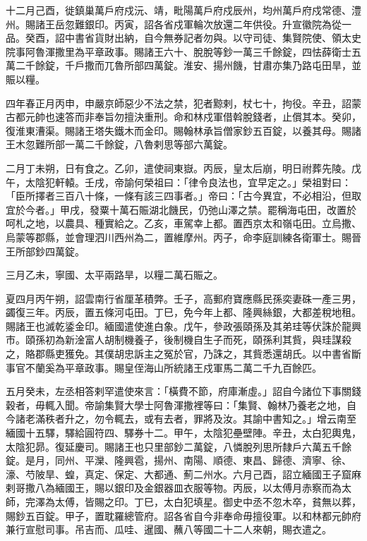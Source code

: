 \begin{pinyinscope}
 十二月己酉，徙鎮巢萬戶府戍沅、靖，毗陽萬戶府戍辰州，均州萬戶府戍常德、澧州。賜諸王岳忽難銀印。丙寅，詔各省戍軍輪次放還二年供役。升宣徽院為從一品。癸酉，詔中書省貨財出納，自今無券記者勿與。以守司徒、集賢院使、領太史院事阿魯渾撒里為平章政事。賜諸王六十、脫脫等鈔一萬三千餘錠，四怯薛衛士五萬二千餘錠，千戶撒而兀魯所部四萬錠。淮安、揚州饑，甘肅亦集乃路屯田旱，並賑以糧。



 四年春正月丙申，申嚴京師惡少不法之禁，犯者黥剌，杖七十，拘役。辛丑，詔蒙古都元帥也速答而非奉旨勿擅決重刑。命和林戍軍借斡脫錢者，止償其本。癸卯，復淮東漕渠。賜諸王塔失鐵木而金印。賜翰林承旨僧家鈔五百錠，以養其母。賜諸王木忽難所部一萬二千餘錠，八魯剌思等部六萬錠。



 二月丁未朔，日有食之。乙卯，遣使祠東嶽。丙辰，皇太后崩，明日祔葬先陵。戊午，太陰犯軒轅。壬戌，帝諭何榮祖曰：「律令良法也，宜早定之。」榮祖對曰：「臣所擇者三百八十條，一條有該三四事者。」帝曰：「古今異宜，不必相沿，但取宜於今者。」甲戌，發粟十萬石賑湖北饑民，仍弛山澤之禁。罷稱海屯田，改置於呵札之地，以農具、種實給之。乙亥，車駕幸上都。置西京太和嶺屯田。立烏撒、烏蒙等郡縣，並會理泗川西州為二，置維摩州。丙子，命李庭訓練各衛軍士。賜晉王所部鈔四萬錠。



 三月乙未，寧國、太平兩路旱，以糧二萬石賑之。



 夏四月丙午朔，詔雲南行省厘革積弊。壬子，高郵府寶應縣民孫奕妻硃一產三男，蠲復三年。丙辰，置五條河屯田。丁巳，免今年上都、隆興絲銀，大都差稅地租。賜諸王也滅乾鋈金印。緬國遣使進白象。戊午，參政張頤孫及其弟珪等伏誅於龍興市。頤孫初為新淦富人胡制機養子，後制機自生子而死，頤孫利其貲，與珪謀殺之，賂郡縣吏獲免。其僕胡忠訴主之冤於官，乃誅之，其貲悉還胡氏。以中書省斷事官不蘭奚為平章政事。賜皇侄海山所統諸王戍軍馬二萬二千九百餘匹。



 五月癸未，左丞相答剌罕遣使來言：「橫費不節，府庫漸虛。」詔自今諸位下事關錢穀者，毋輒入聞。帝諭集賢大學士阿魯渾撒裡等曰：「集賢、翰林乃養老之地，自今諸老滿秩者升之，勿令輒去，或有去者，罪將及汝。其諭中書知之。」增云南至緬國十五驛，驛給圓符四、驛券十二。甲午，太陰犯壘壁陣。辛丑，太白犯輿鬼，太陰犯昴。復延慶司。賜諸王也只里部鈔二萬錠，八憐脫列思所隸戶六萬五千餘錠。是月，同州、平灤、隆興雹，揚州、南陽、順德、東昌、歸德、濟寧、徐、濠、芍陂旱、蝗，真定、保定、大都通、薊二州水。六月己酉，詔立緬國王子窟麻剌哥撒八為緬國王，賜以銀印及金銀器皿衣服等物。丙辰，以太傅月赤察而為太師，完澤為太傅，皆賜之印。丁巳，太白犯填星。御史中丞不忽木卒，貧無以葬，賜鈔五百錠。甲子，置耽羅總管府。詔各省自今非奉命毋擅役軍。以和林都元帥府兼行宣慰司事。吊吉而、瓜哇、暹國、蘸八等國二十二人來朝，賜衣遣之。




\end{pinyinscope}

